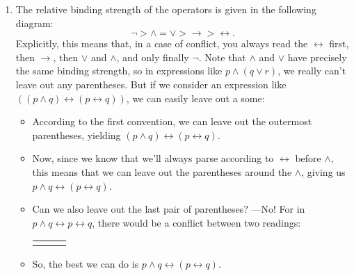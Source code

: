 \begin{enumerate}[\thesection.1]
	\item The relative binding strength of the operators is given in the following diagram:
\[{\neg}>{\land}={\lor}>{\to}>{\leftrightarrow}.\] Explicitly, this means that, in a case of conflict, you always read the $\leftrightarrow$ first, then $\to$, then $\lor$ and $\land$, and only finally $\neg$. Note that $\land$ and $\lor$ have precisely the same binding strength, so in expressions like $p\land (q\lor r)$, we really can't leave out any parentheses. But if we consider an expression like $((p\land q)\leftrightarrow (p\leftrightarrow q))$, we can easily leave out a some:
	\begin{itemize}
	
		\item According to the first convention, we can leave out the outermost parentheses, yielding $(p\land q)\leftrightarrow (p\leftrightarrow q)$.
		
		\item Now, since we know that we'll always parse according to $\leftrightarrow$ before $\land$, this means that we can leave out the parentheses around the $\land$, giving us $p\land q\leftrightarrow (p\leftrightarrow q)$.
		
		\item Can we also leave out the last pair of parentheses? ---No! For in $p\land q\leftrightarrow p\leftrightarrow q$, there would be a conflict between two readings:
	\begin{center}
		
		\begin{tabular}{c c c}
		\begin{tikzpicture}
		{\Tree [.$p\land q\leftrightarrow p\leftrightarrow q$ [.$p\land q$ [.$p$ ] [.$q$ ] ] [.$p\leftrightarrow q$ [.$p$ ] [.$q$ ] ] ]}
		\end{tikzpicture}

		& 
		
		\qquad \raisebox{7.5ex}{vs.} \qquad & 
				\begin{tikzpicture}
		{\Tree [.$p\land q\leftrightarrow p\leftrightarrow q$ [.$p\land q\leftrightarrow p$ [.$p\land q$ [.$p$ ] [.$q$ ] ] [.$p$ ] ] [.$q$ ] ]}
		\end{tikzpicture}

		\end{tabular}
		\end{center}
		
		\item So, the best we can do is $p\land q\leftrightarrow (p\leftrightarrow q)$.
	

\end{itemize}
\end{enumerate}
